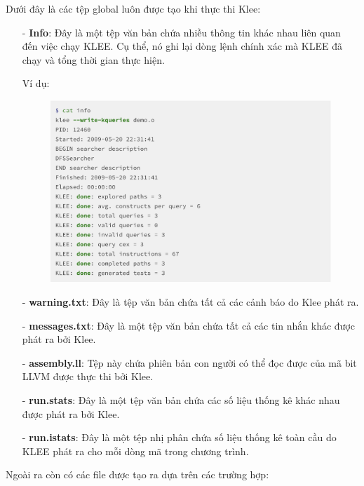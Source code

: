 \documentclass[12pt,a4paper]{report}
\begin{document}
Dưới đây là các tệp global luôn được tạo khi thực thi Klee:

\begin{itemize}
\item[-] \textbf{Info}: Đây là một tệp văn bản chứa nhiều thông tin khác nhau liên quan đến việc chạy KLEE. Cụ thể, nó ghi lại dòng lệnh chính xác mà KLEE đã chạy và tổng thời gian thực hiện. 

Ví dụ:

\begin{figure}[ht]
\begin{center}
\includegraphics[scale=.3]{hinhanh/fileinfo.png}
\end{center}
\end{figure}

\item[-] \textbf{warning.txt}: Đây là tệp văn bản chứa tất cả các cảnh báo do Klee phát ra.
\item[-] \textbf{messages.txt}: Đây là một tệp văn bản chứa tất cả các tin nhắn khác được phát ra bởi Klee.
\item[-] \textbf{assembly.ll}: Tệp này chứa phiên bản con người có thể đọc được của mã bit LLVM được thực thi bởi Klee. 
\item[-] \textbf{run.stats}: Đây là một tệp văn bản chứa các số liệu thống kê khác nhau được phát ra bởi Klee.
\item[-] \textbf{run.istats}: Đây là một tệp nhị phân chứa số liệu thống kê toàn cầu do KLEE phát ra cho mỗi dòng mã trong chương trình.
\end{itemize}

Ngoài ra còn có các file được tạo ra dựa trên các trường hợp:
\end{document}
